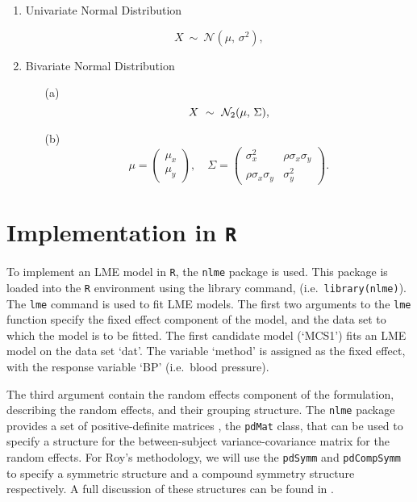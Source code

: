 \documentclass[12pt, a4paper]{report}
\theoremstyle{plain}
\theoremstyle{definition}
\theoremstyle{remark}
\begin{document}
\bigskip

\begin{enumerate}
	\item Univariate Normal Distribution
	
	\[
	X\ \sim\ \mathcal{N}(\mu,\, \sigma^2),
	\]
	
	\item Bivariate Normal Distribution
	
	\begin{itemize}
		\item[(a)] \[  X\ \sim\ \mathcal{N}_2(\mu,\, \Sigma), \vspace{1cm}\]
		\item[(b)] \[    \mu = \begin{pmatrix} \mu_x \\ \mu_y \end{pmatrix}, \quad
		\Sigma = \begin{pmatrix} \sigma_x^2 & \rho \sigma_x \sigma_y \\
		\rho \sigma_x \sigma_y  & \sigma_y^2 \end{pmatrix}.\]
	\end{itemize}
\end{enumerate}


		\section{Implementation in \texttt{R}}
		To implement an LME model in \texttt{R}, the \texttt{nlme} package is used. This package is loaded into the \texttt{R} environment using the library command, (i.e.\ \texttt{library(nlme)}). The \texttt{lme} command is used to fit LME models. The first two arguments to the \texttt{lme} function specify the fixed effect component of the model, and the data set to which the model is to be fitted. The first candidate model (`MCS1') fits an LME model on the data set `dat'. The variable `method' is assigned as the fixed effect, with the response variable `BP' (i.e.\ blood pressure).
		
		The third argument contain the random effects component of the formulation, describing the random effects, and their grouping structure. The \texttt{nlme} package provides a set of positive-definite matrices , the \texttt{pdMat} class, that can be used to specify a structure for the between-subject variance-covariance matrix for the random effects. For Roy's methodology, we will use the \texttt{pdSymm} and \texttt{pdCompSymm} to specify a symmetric structure and a compound symmetry structure respectively. A full discussion of these structures can be found in \citet[pg. 158]{PB}.
		
\end{document}
